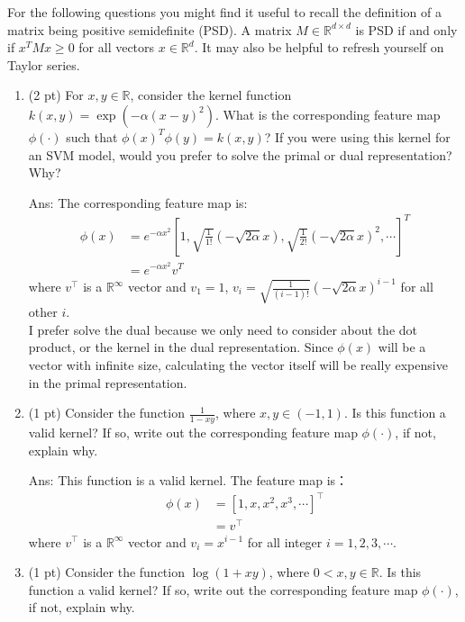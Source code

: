 \documentclass[10pt,letter,notitlepage]{article}
\newcommand{\ans}[1]{{\color{orange}\textsf{Ans}: #1}}
\newcounter{exercise}
\begin{document}
\begin{exercise}
      For the following questions you might find it useful to recall the definition of a matrix being positive semidefinite (PSD).
      A matrix $M \in \mathbb{R}^{d \times d}$ is PSD if and only if $x^T Mx \geq 0$ for all vectors $x \in \mathbb{R}^d$.
      It may also be helpful to refresh yourself on Taylor series.

  \begin{enumerate}
    \item (2 pt) For $x, y \in \mathbb{R}$, consider the kernel function $k(x, y) = \exp\left(-\alpha\left(x - y\right)^2\right)$.
      What is the corresponding feature map $\phi(\cdot)$ such that $\phi(x)^T \phi(y) = k(x, y)$?
      If you were using this kernel for an SVM model, would you prefer to solve the primal or dual representation? Why?

\ans{
  The corresponding feature map is:
  \begin{align*}
  \phi(x) &= e^{-\alpha x^2} [1, \sqrt{\frac{1}{1!}}(-\sqrt{2\alpha}x), \sqrt{\frac{1}{2!}}(-\sqrt{2\alpha}x)^2, \cdots]^T \\
  &= e^{-\alpha x^2} v^T 
  \end{align*}
  where $v^\top$ is a $\mathbb{R}^{\infty}$ vector and $v_1 = 1$, $v_i = \sqrt{\frac{1}{(i-1)!}}(-\sqrt{2\alpha}x)^{i-1}$ for all other $i$. \\
  I prefer solve the dual because we only need to consider about the dot product, or the kernel in the dual representation. Since $\phi(x)$ 
  will be a vector with infinite size, calculating the vector itself will be really expensive in the primal representation.
}


    \item (1 pt) Consider the function $\frac{1}{1 - xy}$, where $x, y \in (-1, 1)$.
      Is this function a valid kernel?
      If so, write out the corresponding feature map $\phi(\cdot)$, if not, explain why.

\ans{
  This function is a valid kernel. The feature map is：
  \begin{align*}
  \phi(x) &= [1, x, x^2, x^3, \cdots]^\top \\
  &= v^\top
  \end{align*}
  where $v^\top$ is a $\mathbb{R}^{\infty}$ vector and $v_i = x^{i-1}$ for all integer $i=1,2,3,\cdots$.
}
    \item (1 pt) Consider the function $\log (1 + xy)$, where $0 < x, y \in \mathbb{R}$.
      Is this function a valid kernel?
      If so, write out the corresponding feature map $\phi(\cdot)$, if not, explain why.


\end{enumerate}
\end{exercise}
\end{document}
